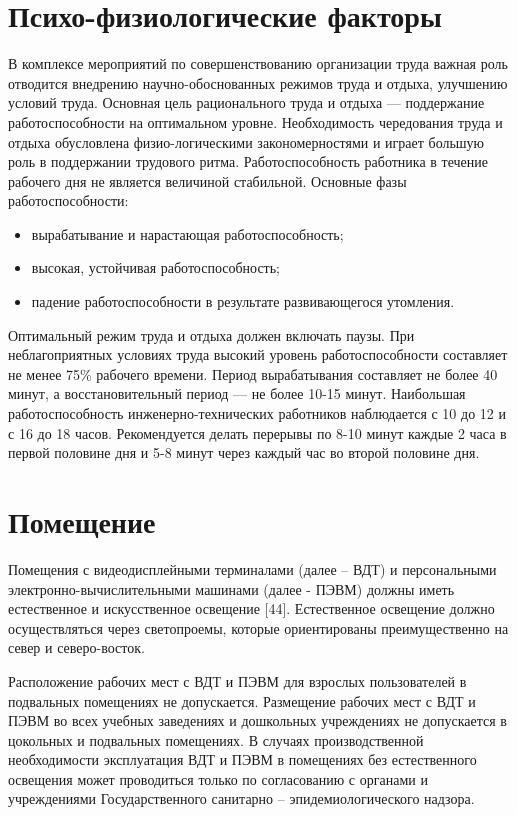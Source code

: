 \documentclass[12pt,a4paper]{report}
\begin{document}
\section{Психо-физиологические факторы}
В комплексе мероприятий по совершенствованию организации труда важная роль отводится внедрению научно-обоснованных режимов труда и отдыха, улучшению условий труда. Основная цель рационального труда и отдыха — поддержание работоспособности на оптимальном уровне. Необходимость чередования труда и отдыха обусловлена физио-логическими закономерностями и играет большую роль в поддержании трудового ритма. Работоспособность работника в течение рабочего дня не является величиной стабильной. Основные фазы работоспособности:
\begin{itemize}
\item вырабатывание и нарастающая работоспособность;
\item высокая, устойчивая работоспособность;
\item падение работоспособности в результате развивающегося утомления.
\end{itemize}

Оптимальный режим труда и отдыха должен включать паузы. При неблагоприятных условиях труда высокий уровень работоспособности составляет не менее 75\% рабочего времени. Период вырабатывания составляет не более 40 минут, а восстановительный период — не более 10-15 минут. Наибольшая работоспособность инженерно-технических работников наблюдается с 10 до 12 и с 16 до 18 часов. Рекомендуется делать перерывы по 8-10 минут каждые 2 часа в первой половине дня и 5-8 минут через каждый час во второй половине дня.

\section{Помещение}
Помещения с видеодисплейными терминалами (далее – ВДТ) и персональными электронно-вычислительными машинами (далее - ПЭВМ) должны иметь естественное и искусственное освещение [44]. Естественное освещение должно осуществляться через светопроемы, которые ориентированы преимущественно на север и северо-восток.

Расположение рабочих мест с ВДТ и ПЭВМ для взрослых пользователей в подвальных помещениях не допускается. Размещение рабочих мест с ВДТ и ПЭВМ во всех учебных заведениях и дошкольных учреждениях не допускается в цокольных и подвальных помещениях. В случаях производственной необходимости эксплуатация ВДТ и ПЭВМ в помещениях без естественного освещения может проводиться только по согласованию с органами и учреждениями Государственного санитарно – эпидемиологического надзора.
\end{document}
